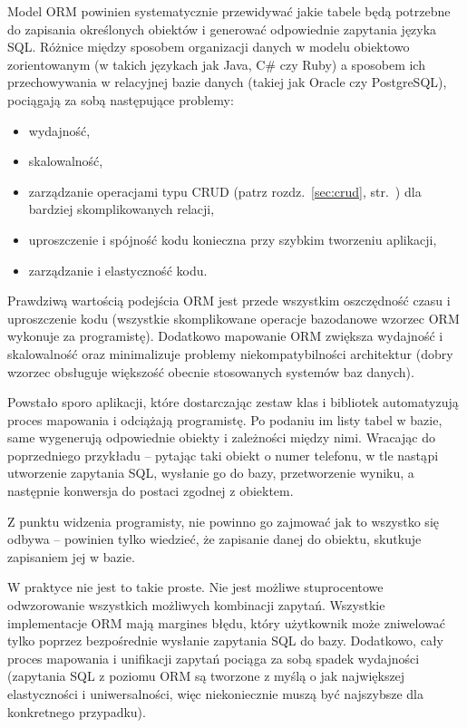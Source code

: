 \documentclass[a4paper,12pt,oneside]{report}
\begin{document}
Model ORM powinien systematycznie przewidywać jakie tabele będą potrzebne do zapisania określonych obiektów i generować odpowiednie zapytania języka SQL. Różnice między sposobem organizacji danych w modelu obiektowo zorientowanym (w takich językach jak Java, C\# czy Ruby) a sposobem ich przechowywania w relacyjnej bazie danych (takiej jak Oracle czy PostgreSQL), pociągają za sobą następujące problemy:
\begin{itemize}
  \item wydajność,
  \item skalowalność,
  \item zarządzanie operacjami typu CRUD (patrz rozdz.~\ref{sec:crud}, str.~\pageref{sec:crud}) dla bardziej skomplikowanych relacji,
  \item uproszczenie i spójność kodu konieczna przy szybkim tworzeniu aplikacji,
  \item zarządzanie i elastyczność kodu.
\end{itemize}

Prawdziwą wartością podejścia ORM jest przede wszystkim oszczędność czasu i uproszczenie kodu (wszystkie skomplikowane operacje bazodanowe wzorzec ORM wykonuje za programistę). Dodatkowo mapowanie ORM zwiększa wydajność i skalowalność oraz minimalizuje problemy niekompatybilności architektur (dobry wzorzec obsługuje większość obecnie stosowanych systemów baz danych).

Powstało sporo aplikacji, które dostarczając zestaw klas i bibliotek automatyzują proces mapowania i odciążają programistę. Po podaniu im listy tabel w bazie, same wygenerują odpowiednie obiekty i zależności między nimi. Wracając do poprzedniego przykładu -- pytając taki obiekt o numer telefonu, w tle nastąpi utworzenie zapytania SQL, wysłanie go do bazy, przetworzenie wyniku, a następnie konwersja do postaci zgodnej z obiektem.

Z punktu widzenia programisty, nie powinno go zajmować jak to wszystko się odbywa -- powinien tylko wiedzieć, że zapisanie danej do obiektu, skutkuje zapisaniem jej w bazie.

W praktyce nie jest to takie proste. Nie jest możliwe stuprocentowe odwzorowanie wszystkich możliwych kombinacji zapytań. Wszystkie implementacje ORM mają margines błędu, który użytkownik może zniwelować tylko poprzez bezpośrednie wysłanie zapytania SQL do bazy. Dodatkowo, cały proces mapowania i unifikacji zapytań pociąga za sobą spadek wydajności (zapytania SQL z poziomu ORM są tworzone z myślą o jak największej elastyczności i uniwersalności, więc niekoniecznie muszą być najszybsze dla konkretnego przypadku).
\end{document}
